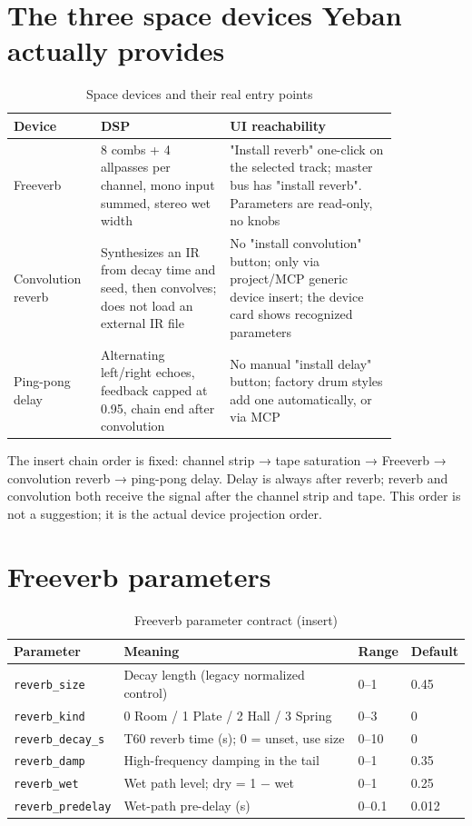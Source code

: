 \section{The three space devices Yeban actually provides}

\begin{table}[htbp]
\centering
\small
\begin{tabular}{@{}p{0.15\linewidth}p{0.30\linewidth}p{0.39\linewidth}@{}}
\hline
Device & DSP & UI reachability \\
\hline
Freeverb & 8 combs + 4 allpasses per channel, mono input summed, stereo wet width & "Install reverb" one-click on the selected track; master bus has "install reverb". Parameters are read-only, no knobs \\
Convolution reverb & Synthesizes an IR from decay time and seed, then convolves; does not load an external IR file & No "install convolution" button; only via project/MCP generic device insert; the device card shows recognized parameters \\
Ping-pong delay & Alternating left/right echoes, feedback capped at 0.95, chain end after convolution & No manual "install delay" button; factory drum styles add one automatically, or via MCP \\
\hline
\end{tabular}
\caption{Space devices and their real entry points}
\label{tab:space-devices}
\end{table}

The insert chain order is fixed: channel strip → tape saturation → Freeverb → convolution reverb → ping-pong delay. Delay is always after reverb; reverb and convolution both receive the signal after the channel strip and tape. This order is not a suggestion; it is the actual device projection order.

\section{Freeverb parameters}

\begin{table}[htbp]
\centering
\small
\begin{tabular}{@{}llll@{}}
\hline
Parameter & Meaning & Range & Default \\
\hline
\texttt{reverb\_size} & Decay length (legacy normalized control) & 0–1 & 0.45 \\
\texttt{reverb\_kind} & 0 Room / 1 Plate / 2 Hall / 3 Spring & 0–3 & 0 \\
\texttt{reverb\_decay\_s} & T60 reverb time (s); 0 = unset, use size & 0–10 & 0 \\
\texttt{reverb\_damp} & High-frequency damping in the tail & 0–1 & 0.35 \\
\texttt{reverb\_wet} & Wet path level; dry = 1 − wet & 0–1 & 0.25 \\
\texttt{reverb\_predelay} & Wet-path pre-delay (s) & 0–0.1 & 0.012 \\
\hline
\end{tabular}
\caption{Freeverb parameter contract (insert)}
\label{tab:reverb-params}
\end{table}

